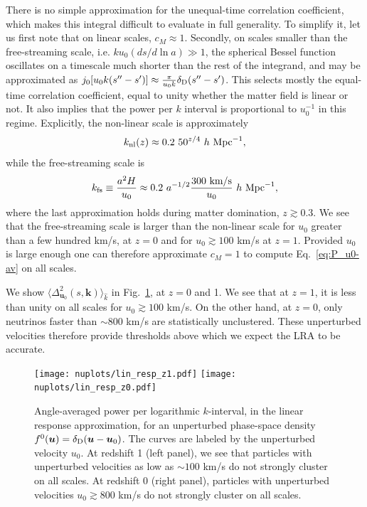 \documentclass[useAMS, usenatbib]{mnras}
\newcommand{\beq}{\begin{equation}}
\newcommand{\eeq}{\end{equation}}
\newcommand{\barr}{\begin{eqnarray}}
\newcommand{\earr}{\end{eqnarray}}
\newcommand{\bs}{\boldsymbol}
\begin{document}
There is no simple approximation for the unequal-time correlation coefficient, which makes this integral difficult to evaluate in full generality. To simplify it, let us first note that on linear scales, $c_M \approx 1$. Secondly, on scales smaller than the free-streaming scale, i.e. $k u_0 (ds/d\ln a) \gg 1$, the spherical Bessel function oscillates on a timescale much shorter than the rest of the integrand, and may be approximated as $j_0[u_0 k (s'' - s')] \approx \frac{\pi}{u_0 k} \delta_{\rm D}(s'' - s')$. This selects mostly the equal-time correlation coefficient, equal to unity whether the matter field is linear or not. It also implies that the power per $k$ interval is proportional to $u_0^{-1}$ in this regime.
Explicitly, the non-linear scale is approximately
 \beq
 k_{\rm nl}(z) \approx 0.2~50^{z/4}~ h ~ \textrm{Mpc}^{-1},
 \eeq
while the free-streaming scale is
\beq
k_{\rm fs} \equiv \frac{a^2 H}{u_0} \approx 0.2 ~a^ {-1/2}\frac{300~ \textrm{km/s}}{u_0} ~ h ~ \textrm{Mpc}^{-1},
\eeq
where the last approximation holds during matter domination, $z \gtrsim 0.3$. We see that the free-streaming scale is larger than the non-linear scale for $u_0$ greater than a few hundred km/s, at $z = 0$ and for $u_0 \gtrsim 100$ km/s at $z = 1$. Provided $u_0$ is large enough one can therefore approximate $c_M = 1$ to compute Eq.~\eqref{eq:P_u0-av} on all scales.

We show $\langle \Delta^2_{\bs{u}_0}(s, \bs{k})\rangle_{\hat{k}}$ in Fig.~\ref{fig:halofitvshell}, at $z = 0$ and 1. We see that at $z = 1$, it is less than unity on all scales for $u_0 \gtrsim 100$ km/s. On the other hand, at $z= 0$, only neutrinos faster than $\sim 800$ km/s are statistically unclustered. These unperturbed velocities therefore provide thresholds above which we expect the LRA to be accurate.

\begin{figure}
\texttt{[image: nuplots/lin\_resp\_z1.pdf]}
\texttt{[image: nuplots/lin\_resp\_z0.pdf]}
\caption{Angle-averaged power per logarithmic $k$-interval, in the linear response approximation, for an unperturbed phase-space density $f^0(\bs{u}) = \delta_{\rm D}(\bs{u}- \bs{u}_0)$. The curves are labeled by the unperturbed velocity $u_0$. At redshift 1 (left panel), we see that particles with unperturbed velocities as low as $\sim 100$ km/s do not strongly cluster on all scales. At redshift 0 (right panel), particles with unperturbed velocities $u_0 \gtrsim 800$ km/s do not strongly cluster on all scales.}
\label{fig:halofitvshell}
\end{figure}
\end{document}
